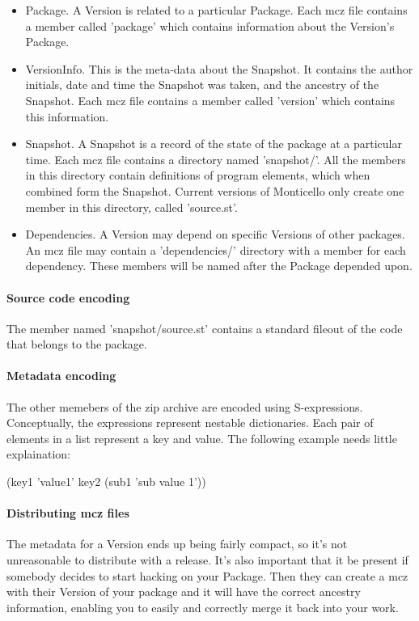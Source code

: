 \documentclass[a4paper,10pt,twoside]{book}
\begin{document}
\begin{itemize}
\item Package. A Version is related to a particular Package. Each mcz file contains a member called 'package' which contains information about the Version's Package.

\item VersionInfo. This is the meta-data about the Snapshot. It contains the author initials, date and time the Snapshot was taken, and the ancestry of the Snapshot. Each mcz file contains a member called 'version' which contains this information.
\item Snapshot. A Snapshot is a record of the state of the package at a particular time. Each mcz file contains a directory named 'snapshot/'. All the members in this directory contain definitions of program elements, which when combined form the Snapshot. Current versions of Monticello only create one member in this directory, called 'source.st'.
\item Dependencies. A Version may depend on specific Versions of other packages. An mcz file may contain a 'dependencies/' directory with a member for each dependency. These members will be named after the Package depended upon.
\end{itemize}

\paragraph{Source code encoding}

The member named 'snapshot/source.st' contains a standard fileout of the code that belongs to the package.

\paragraph{Metadata encoding}

The other memebers of the zip archive are encoded using S-expressions. Conceptually, the expressions represent nestable dictionaries. Each pair of elements in a list represent a key and value. The following example needs little explaination:

(key1 'value1' key2 (sub1 'sub value 1'))

\paragraph{Distributing mcz files}

The metadata for a Version ends up being fairly compact, so it's not unreasonable to distribute with a release. It's also important that it be present if somebody decides to start hacking on your Package. Then they can create a mcz with their Version of your package and it will have the correct ancestry information, enabling you to easily and correctly merge it back into your work.
\end{document}
